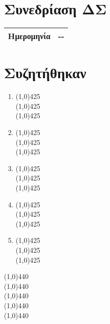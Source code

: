 \setcounter{section}{0}
\section{Συνεδρίαση ΔΣ}
\begin{Large}
\begin{tabular}{|l|>{\centering\arraybackslash}p{5.2cm}|}
\hline
Ημερομηνία & { \hspace{0.7cm}-\hspace{0.7cm}-\hspace{1.4cm}} \\ \hline
\end{tabular}
\end{Large}
\vspace{1cm}
\section{Συζητήθηκαν}
\begin{Large}
\begin{enumerate}
 \item \line(1,0){425} \\
 \line(1,0){425} \\
 \line(1,0){425} \\
 \item \line(1,0){425} \\
 \line(1,0){425} \\
 \line(1,0){425} \\
  \item \line(1,0){425} \\
 \line(1,0){425} \\
 \line(1,0){425} \\
  \item \line(1,0){425} \\
 \line(1,0){425} \\
 \line(1,0){425} \\
  \item \line(1,0){425} \\
 \line(1,0){425} \\
 \line(1,0){425} \\

\end{enumerate}
\begin{center}
\line(1,0){440} \\
\line(1,0){440} \\
\line(1,0){440} \\
\line(1,0){440} \\
\line(1,0){440} \\
\end{center}
\end{Large}
\newpage
